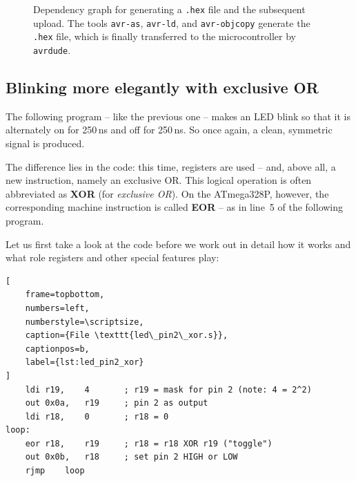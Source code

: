 \documentclass[a4paper,12pt]{article}
\begin{document}
\vspace{57bp}
\begin{figure}[ht]
\centering
{}
\caption{
    Dependency graph for generating a \texttt{.hex} file and the subsequent
    upload. The tools \texttt{avr-as}, \texttt{avr-ld}, and
    \texttt{avr-objcopy} generate the \texttt{.hex} file, which is finally
    transferred to the microcontroller by \texttt{avrdude}.
}
\label{fig:makegraph}
\end{figure}


\newpage
\subsection{Blinking more elegantly with exclusive OR}

The following program – like the previous one – makes an LED blink so that it
is alternately on for 250\,ns and off for 250\,ns. So once again, a clean,
symmetric signal is produced.

The difference lies in the code: this time, registers are used – and, above
all, a new instruction, namely an exclusive OR. This logical operation is
often abbreviated as \textbf{XOR} (for \emph{exclusive OR}).
On the ATmega328P, however, the corresponding machine instruction is called
\textbf{EOR} – as in line~5 of the following program.

Let us first take a look at the code before we work out in detail how it
works and what role registers and other special features play:

\begin{lstlisting}[
    frame=topbottom,
    numbers=left,
    numberstyle=\scriptsize,
    caption={File \texttt{led\_pin2\_xor.s}},
    captionpos=b,
    label={lst:led_pin2_xor}
]
	ldi	r19,	4	    ; r19 = mask for pin 2 (note: 4 = 2^2)
	out	0x0a,	r19	    ; pin 2 as output
	ldi	r18,	0	    ; r18 = 0
loop:
	eor	r18,	r19	    ; r18 = r18 XOR r19 ("toggle")
	out	0x0b,	r18	    ; set pin 2 HIGH or LOW
	rjmp	loop
\end{lstlisting}
\end{document}
